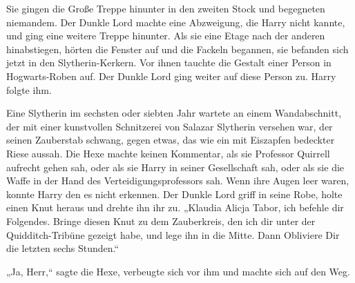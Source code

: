 Sie gingen die Große Treppe hinunter in den zweiten Stock und begegneten niemandem.
Der Dunkle Lord machte eine Abzweigung, die Harry nicht kannte, und ging eine weitere Treppe hinunter. Als sie eine Etage nach der anderen hinabstiegen, hörten die Fenster auf und die Fackeln begannen, sie befanden sich jetzt in den Slytherin-Kerkern.
Vor ihnen tauchte die Gestalt einer Person in Hogwarts-Roben auf.
Der Dunkle Lord ging weiter auf diese Person zu.
Harry folgte ihm.

Eine Slytherin im sechsten oder siebten Jahr wartete an einem Wandabschnitt, der mit einer kunstvollen Schnitzerei von Salazar Slytherin versehen war, der seinen Zauberstab schwang, gegen etwas, das wie ein mit Eiszapfen bedeckter Riese aussah. Die Hexe machte keinen Kommentar, als sie Professor Quirrell aufrecht gehen sah, oder als sie Harry in seiner Gesellschaft sah, oder als sie die Waffe in der Hand des Verteidigungsprofessors sah. Wenn ihre Augen leer waren, konnte Harry den es nicht erkennen.
Der Dunkle Lord griff in seine Robe, holte einen Knut heraus und drehte ihn ihr zu.
„Klaudia Alicja Tabor, ich befehle dir Folgendes. Bringe diesen Knut zu dem Zauberkreis, den ich dir unter der Quidditch-Tribüne gezeigt habe, und lege ihn in die Mitte. Dann Obliviere Dir die letzten sechs Stunden.“

„Ja, Herr,“ sagte die Hexe, verbeugte sich vor ihm und machte sich auf den Weg.


